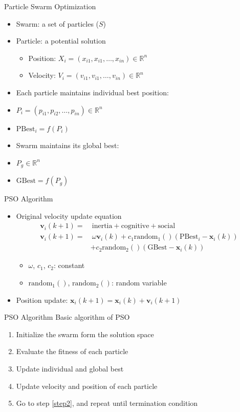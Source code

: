 \documentclass[pdflatex,compress,mathserif]{beamer}
\begin{document}
\begin{frame}{Particle Swarm Optimization}
	\begin{itemize}
		\item Swarm: a set of particles ($S$)
		\item Particle: a potential solution
		\begin{itemize}
			\item Position: $X_i = (x_{i1},x_{i1},\dots,x_{in}) \in \mathbb{R}^n$
			\item Velocity: $V_i = (v_{i1},v_{i1},\dots,v_{in}) \in \mathbb{R}^n$
		\end{itemize}
		\item Each particle maintains individual best position:
		\item[] $P_i = (p_{i1}, p_{i2}, \dots, p_{in}) \in \mathbb{R}^n$
		\item[] $\text{PBest}_i = f(P_i)$
		\item Swarm maintains its global best:
		\item[] $P_g \in \mathbb{R}^n$
		\item[] $\text{GBest} = f(P_g)$
	\end{itemize}
\end{frame}

\begin{frame}{PSO Algorithm}
	\begin{itemize}
		\item Original velocity update equation
		\begin{align*}
			\mathbf{v}_i (k+1) =&~ \text{inertia} + \text{cognitive} + \text{social} \\
			\mathbf{v}_i(k+1) =&~ \omega \mathbf{v}_i(k) + c_1 \text{random}_1()(\text{PBest}_i - \mathbf{x}_i(k))\\
			&+ c_2 \text{random}_2()(\text{GBest} - \mathbf{x}_i(k))
		\end{align*}
		\begin{itemize}
			\item $\omega$, $c_1$, $c_2$: constant
			\item $\text{random}_1()$, $\text{random}_2()$: random variable
		\end{itemize}
		\item Position update: $\mathbf{x}_i(k+1) = \mathbf{x}_i(k) + \mathbf{v}_i(k+1)$
	\end{itemize}
\end{frame}

\begin{frame}{PSO Algorithm}
	Basic algorithm of PSO
	\begin{enumerate}
		\item Initialize the swarm form the solution space 
		\item Evaluate the fitness of each particle \label{step2}
		\item Update individual and global best
		\item Update velocity and position of each particle
		\item Go to step \ref{step2}, and repeat until termination condition
	\end{enumerate}
\end{frame}
\end{document}
